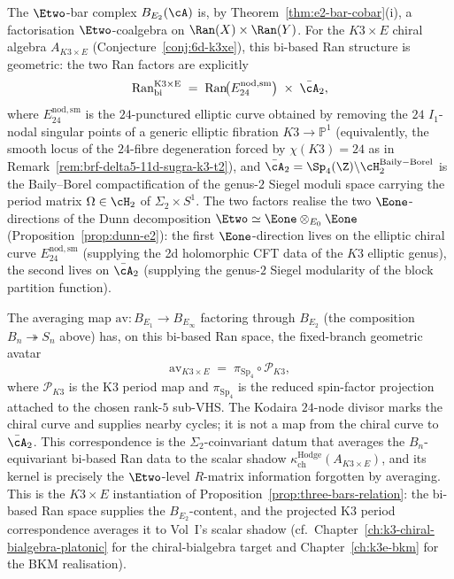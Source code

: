 \begin{remark}
\label{rem:brf-k3xe-bi-based-ran-torelli-ks}
The $\Etwo$-bar complex $B_{E_2}(\cA)$ is, by Theorem~\ref{thm:e2-bar-cobar}(i), a factorisation
$\Etwo$-coalgebra on $\Ran(X) \times \Ran(Y)$. For the $K3 \times E$
chiral algebra $A_{K3 \times E}$ (Conjecture~\ref{conj:6d-k3xe}),
this bi-based Ran structure is geometric: the two
Ran factors are explicitly
\[
 \mathrm{Ran}^{\mathrm{K3 \times E}}_{\mathrm{bi}}
 \;=\; \mathrm{Ran}\!\bigl(E^{\mathrm{nod,sm}}_{24}\bigr)
 \;\times\; \bar{\cA}_2,
\]
where $E^{\mathrm{nod,sm}}_{24}$ is the $24$-punctured elliptic
curve obtained by removing the $24$ $I_1$-nodal singular points of
a generic elliptic fibration $K3 \to \mathbb{P}^1$ (equivalently,
the smooth locus of the $24$-fibre degeneration forced by
$\chi(K3) = 24$ as in Remark~\ref{rem:brf-delta5-11d-sugra-k3-t2}), and
$\bar{\cA}_2 = \Sp_4(\Z) \backslash \cH_2^{\mathrm{Baily-Borel}}$
is the Baily--Borel compactification of the genus-$2$ Siegel
moduli space carrying the period matrix $\Omega \in \cH_2$ of
$\Sigma_2 \times S^1$. The two factors realise the two
$\Eone$-directions of the Dunn decomposition
$\Etwo \simeq \Eone \otimes_{E_0} \Eone$
(Proposition~\ref{prop:dunn-e2}): the first $\Eone$-direction
lives on the elliptic chiral curve $E^{\mathrm{nod,sm}}_{24}$
(supplying the 2d holomorphic CFT data of the $K3$ elliptic genus),
the second lives on $\bar{\cA}_2$ (supplying the genus-$2$ Siegel
modularity of the block partition function).

The averaging map $\mathrm{av} \colon B_{E_1} \to B_{E_\infty}$
factoring through $B_{E_2}$ (the composition
$B_n \twoheadrightarrow S_n$ above) has, on this bi-based
Ran space, the fixed-branch geometric avatar
\[
 \mathrm{av}_{K3 \times E}
 \;=\;
 \pi_{\mathrm{Sp}_4}\circ\mathscr P_{K3},
\]
where \(\mathscr P_{K3}\) is the K3 period map and \(\pi_{\mathrm{Sp}_4}\) is the reduced spin-factor projection attached to the chosen rank-\(5\) sub-VHS. The Kodaira \(24\)-node divisor marks the chiral curve and supplies nearby cycles; it is not a map from the chiral curve to \(\bar{\cA}_2\). This correspondence is the $\Sigma_2$-coinvariant datum that
averages the $B_n$-equivariant bi-based Ran data to the scalar
shadow $\kappa_{\mathrm{ch}}^{\mathrm{Hodge}}(A_{K3 \times E})$, and its kernel is
precisely the $\Etwo$-level $R$-matrix information forgotten by
averaging. This is the $K3 \times E$ instantiation of
Proposition~\ref{prop:three-bars-relation}: the bi-based Ran
space supplies the $B_{E_2}$-content, and the projected K3 period
correspondence averages it to Vol~I's scalar shadow
(cf.\ Chapter~\ref{ch:k3-chiral-bialgebra-platonic} for the
chiral-bialgebra target and Chapter~\ref{ch:k3e-bkm} for the BKM
realisation).
\end{remark}


